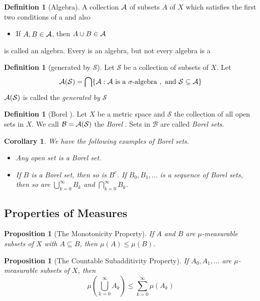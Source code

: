 \documentclass[10pt, oneside, reqno]{amsart}
\theoremstyle{plain}%
\newtheorem{prop}[thm]{Proposition}
\newtheorem*{cor}{Corollary}
\theoremstyle{definition}
\newtheorem{defn}[thm]{Definition}
\theoremstyle{remark}
\begin{document}
\begin{defn}[Algebra]
    A collection $\mathcal{A}$ of subsets $A$ of $X$ which satisfies the first two conditions of a \sig and also 
    \begin{itemize}
        \item If $A, B \in \mathcal{A}$, then $A \cup B \in \mathcal{A}$
    \end{itemize}
    is called an algebra.  Every \sig is an algebra, but not every algebra is a \sig
\end{defn}

\begin{defn}[\sig generated by $\mathcal{S}$]
    Let $\mathcal{S}$ be a collection of subsets of $X$.  Let \[
        \mathcal{A}(\mathcal{S}) = \bigcap \{ \mathcal{A} : \mathcal{A} \text{ is a $\sigma$-algebra }, \text{ and } \mathcal{S} \subseteq \mathcal{A} \}
    \]
$   \mathcal{A}(\mathcal{S})$ is called the \emph{\sig generated by $\mathcal{S}$}
\end{defn}

\begin{defn}[Borel \sig]
    Let $X$ be a metric space and $\mathcal{S}$ the collection of all open sets in $X$.  We call $\mathcal{B} = \mathcal{A}(\mathcal{S})$ the \emph{Borel \sig}.  Sets in $\mathcal{B}$ are called \emph{Borel sets}.
\end{defn}
\begin{cor}
    We have the following examples of Borel sets.
    \begin{itemize}
        \item Any open set is a Borel set.
        \item If $B$ is a Borel set, then so is $B^c$.
        If $B_0, B_1,\dots$ is a sequence of Borel sets, then so are $\bigcup_{k=0}^\infty B_k$ and $\bigcap_{k=0}^\infty B_k$.
    \end{itemize}
\end{cor}
\subsection{Properties of Measures} %
\label{sub:properties_of_measures}


\begin{prop}[The Monotonicity Property]
    If $A$ and $B$ are $\mu$-measurable subsets of $X$ with $A \subseteq B$, then $\mu(A)\leq \mu(B)$.
\end{prop}

\begin{prop}[The Countable Subadditivity Property]
    If $A_0,A_1,\dots$ are $\mu$-measurable subsets of $X$, then \[
        \mu(\bigcup_{k=0}^\infty A_k) \leq \sum_{k=0}^\infty \mu(A_k)
    \]
\end{prop}
\end{document}
